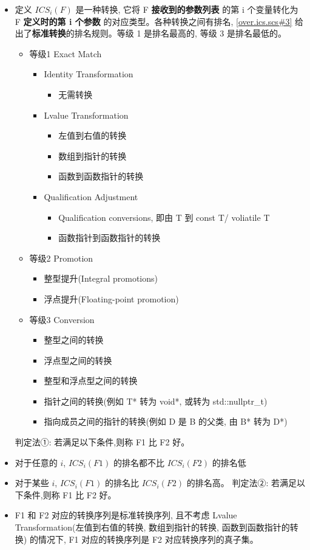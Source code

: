 \documentclass{article}
\begin{document}
	\begin{itemize}
		\item 定义 $ICS_i(F)$ 是一种转换, 它将 F \textbf{接收到的参数列表} 的第 i 个变量转化为 F \textbf{定义时的第 i 个参数} 的对应类型。各种转换之间有排名, \href{https://timsong-cpp.github.io/cppwp/n4659/over.ics.scs#3}{[over.ics.scs\#3]} 给出了\textbf{标准转换}的排名规则。等级 1 是排名最高的, 等级 3 是排名最低的。
		\begin{itemize}
			\item 等级1 Exact Match
			\begin{itemize}
				\item Identity Transformation
				\begin{itemize}
					\item 无需转换
				\end{itemize} 
				\item Lvalue Transformation
				\begin{itemize}
					\item 左值到右值的转换
					\item 数组到指针的转换
					\item 函数到函数指针的转换
				\end{itemize}
				\item Qualification Adjustment
				\begin{itemize}
					\item Qualification conversions, 即由 T 到 const T/ voliatile T
					\item 函数指针到函数指针的转换
				\end{itemize}
			\end{itemize}	
			\item 等级2 Promotion
 			\begin{itemize}
				\item 整型提升(Integral promotions)
				\item 浮点提升(Floating-point promotion)
			\end{itemize}	
			\item 等级3 Conversion
			\begin{itemize}
				\item 整型之间的转换
				\item 浮点型之间的转换
				\item 整型和浮点型之间的转换
				\item 指针之间的转换(例如 T* 转为 void*, 或转为 std::nullptr\_t)
				\item 指向成员之间的指针的转换(例如 D 是 B 的父类, 由 B* 转为 D*)
			\end{itemize}	
		\end{itemize}
		判定法①: 若满足以下条件,则称 F1 比 F2 好。
		\item 对于任意的 $i$, $ICS_i(F1)$ 的排名都不比 $ICS_i(F2)$ 的排名低
		\item 对于某些 $i$, $ICS_i(F1)$ 的排名比 $ICS_i(F2)$ 的排名高。
		判定法②: 若满足以下条件,则称 F1 比 F2 好。
		\item F1 和 F2 对应的转换序列是标准转换序列, 且不考虑 Lvalue Transformation(左值到右值的转换, 数组到指针的转换, 函数到函数指针的转换) 的情况下, F1 对应的转换序列是 F2 对应转换序列的真子集。 
	\end{itemize}
\end{document}
